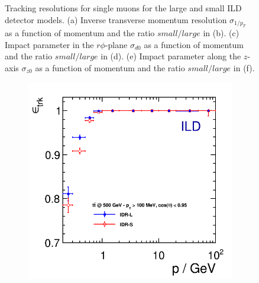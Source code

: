 \begin{figure}[htbp]
\begin{subfigure}{0.49\hsize}
 \caption{  \label{fig:perf:trk_z0cmp}}
 \end{subfigure}
\caption{
  Tracking resolutions for single muons for the large and small ILD detector models.
  (a) Inverse transverse momentum resolution $\sigma_{1/p_T}$ as a function of momentum and the ratio $small/large$ in (b).
  (c) Impact parameter in the $r\phi$-plane $\sigma_{d0}$ as a function of momentum and the ratio $small/large$ in (d).
  (e) Impact parameter along the $z$-axis $\sigma_{z0}$  as a function of momentum and the ratio $small/large$  in (f).
}
\label{fig:perf:trkres}
\end{figure}

%
% 
\begin{figure}[htbp]
\begin{subfigure}{0.49\hsize} 
 \includegraphics[width=\hsize]{Performance/fig/trkEff_p_ttbar_IDR.png}
 \caption{ \label{fig:perf:trkeff_p}}
 \end{subfigure}
\begin{subfigure}{0.49\hsize} 

\end{subfigure}
\end{figure}
